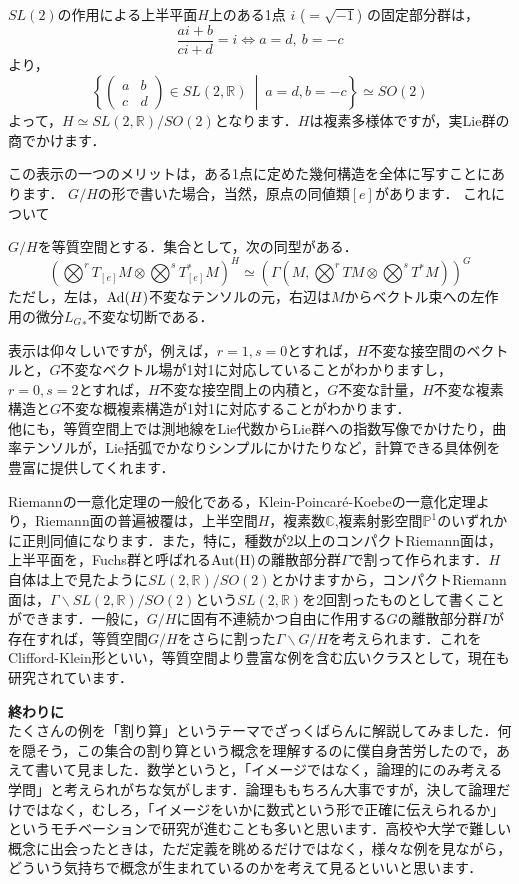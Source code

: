\begin{Ex}[上半平面]
$SL(2)$の作用による上半平面$H$上のある1点 $i$ ($=\sqrt{-1}$) の固定部分群は，
 \[
  \frac{ai+b}{ci+d}=i\Leftrightarrow a=d,\ b=-c
 \]
より，
 \[
  \left\{\begin{pmatrix}
   a&b\\c&d
  \end{pmatrix}\in SL(2,\mathbb{R})\ \middle|\  a=d,b=-c\right\}\simeq SO(2)
 \]
よって，$H\simeq SL(2,\mathbb{R})/SO(2)$となります．$H$は複素多様体ですが，実Lie群の商でかけます．
\end{Ex}

この表示の一つのメリットは，ある1点に定めた幾何構造を全体に写すことにあります．
$G/H$の形で書いた場合，当然，原点の同値類$[e]$があります．
これについて
\begin{Lemma}\label{l4}
  $G/H$を等質空間とする．集合として，次の同型がある．
 \[
  (\bigotimes^rT_{[e]}M\otimes\bigotimes^sT^*_{[e]}M)^H\simeq (\Gamma(M,\bigotimes^rTM\otimes\bigotimes^sT^*M))^G
 \]
 ただし，左は，${\rm Ad}(H)$不変なテンソルの元，右辺は$M$からベクトル束への左作用の微分${L_{G}}_*$不変な切断である．
 \end{Lemma}
表示は仰々しいですが，例えば，$r=1,s=0$とすれば，$H$不変な接空間のベクトルと，$G$不変なベクトル場が1対1に対応していることがわかりますし，$r=0,s=2$とすれば，$H$不変な接空間上の内積と，$G$不変な計量，$H$不変な複素構造と$G$不変な概複素構造が1対1に対応することがわかります．\\
他にも，等質空間上では測地線をLie代数からLie群への指数写像でかけたり，曲率テンソルが，Lie括弧でかなりシンプルにかけたりなど，計算できる具体例を豊富に提供してくれます．


Riemannの一意化定理の一般化である，Klein-Poincar\'e-Koebeの一意化定理より，Riemann面の普遍被覆は，上半空間$H$，複素数$\mathbb{C}$,複素射影空間$\mathbb{P}^1$のいずれかに正則同値になります．また，特に，種数が2以上のコンパクトRiemann面は，上半平面を，Fuchs群と呼ばれる$\rm{Aut}(H)$の離散部分群$\Gamma$で割って作られます．$H$自体は上で見たように$SL(2,\mathbb{R})/SO(2)$とかけますから，コンパクトRiemann面は，$\Gamma\backslash SL(2,\mathbb{R})/SO(2)$という$SL(2,\mathbb{R})$を2回割ったものとして書くことができます．一般に，$G/H$に固有不連続かつ自由に作用する$G$の離散部分群$\Gamma$が存在すれば，等質空間$G/H$をさらに割った$\Gamma\backslash G/H$を考えられます．これをClifford-Klein形といい，等質空間より豊富な例を含む広いクラスとして，現在も研究されています．

{\bf 終わりに}\\
たくさんの例を「割り算」というテーマでざっくばらんに解説してみました．何を隠そう，この集合の割り算という概念を理解するのに僕自身苦労したので，あえて書いて見ました．数学というと，「イメージではなく，論理的にのみ考える学問」と考えられがちな気がします．論理ももちろん大事ですが，決して論理だけではなく，むしろ，「イメージをいかに数式という形で正確に伝えられるか」というモチベーションで研究が進むことも多いと思います．高校や大学で難しい概念に出会ったときは，ただ定義を眺めるだけではなく，様々な例を見ながら，どういう気持ちで概念が生まれているのかを考えて見るといいと思います．

